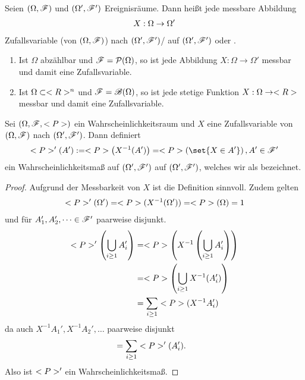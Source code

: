 \begin{definition}[Zufallsvariable]
	Seien $(\Omega, \mathscr{F})$ und $(\Omega', \mathscr{F}')$ Ereignisräume. Dann heißt jede messbare Abbildung
	\begin{align}
		X: \Omega \to \Omega'\notag
	\end{align}
	Zufallsvariable (von $(\Omega, \mathscr{F})$) nach $(\Omega', \mathscr{F}')$/ auf $(\Omega', \mathscr{F}')$ oder .
\end{definition}

\begin{example}
	\begin{enumerate}
		\item Ist $\Omega$ abzählbar und $\mathscr{F} = \mathcal{P}(\Omega)$, so ist jede Abbildung $X: \Omega \to \Omega'$ messbar und damit eine Zufallsvariable.
		\item Ist $\Omega \subset <R>^n$ und $\mathscr{F} = \mathscr{B}(\Omega)$, so ist jede stetige Funktion $X: \Omega \to <R>$ messbar und damit eine Zufallsvariable.
	\end{enumerate}
\end{example}

\begin{proposition}
	Sei $(\Omega, \mathscr{F}, <P>)$ ein Wahrscheinlichkeitsraum und $X$ eine Zufallsvariable von $(\Omega, \mathscr{F})$ nach $(\Omega', \mathscr{F}')$. Dann definiert
	\begin{align}
		\probp'(A') := \probp\left(X^{-1}(A')\right) = \probp\left(\set{X \in A'}\right), A' \in \sigF'\notag
	\end{align}
	ein Wahrscheinlichkeitsmaß auf $(\Omega', \mathscr{F}')$ auf $(\Omega', \mathscr{F}')$, welches wir als  bezeichnet.
\end{proposition}

\begin{proof}
	Aufgrund der Messbarkeit von $X$ ist die Definition sinnvoll. Zudem gelten
	\begin{align}
		<P>'(\Omega') = <P>(X^{-1}(\Omega')) = <P>(\Omega) = 1\notag
	\end{align}
	und für $A_1', A_2', \dots \in \mathscr{F}'$ paarweise disjunkt.
	\begin{align}
		<P>'\left( \bigcup_{i \ge 1} A_i'\right) &= <P>\left(X^{-1}\left( \bigcup_{i \ge 1} A_i' \right)\right) \notag \\
		&= <P>\left( \bigcup_{i \ge 1} X^{-1}(A_i') \right) \notag \\
		&= \sum_{i \ge 1} <P>(X^{-1}A_i') \notag
	\end{align}
	da auch $X^{-1}A_1', X^{-1}A_2', \dots$ paarweise disjunkt
	\begin{align}
		&= \sum_{i \ge 1} <P>'(A_i').\notag
	\end{align}
	Also ist $<P>'$ ein Wahrscheinlichkeitsmaß. %
\end{proof}

